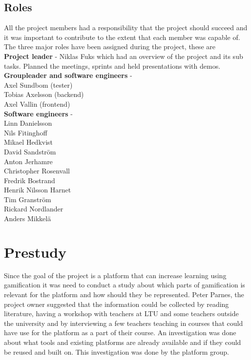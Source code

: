 \documentclass[a4paper,12pt]{article}
\begin{document}
\subsection{Roles} 
All the project members had a responsibility that the project should succeed and it was important to contribute to the extent that each member was capable of.\\
The three major roles have been assigned during the project, these are \\
\textbf{Project leader} - Niklas Fuks which had an overview of the project and its sub tasks. Planned the meetings, sprints and held presentations with demos. \\
\textbf{Groupleader and software engineers} -\\
Axel Sundbom (tester)\\
Tobias Axelsson (backend) \\
Axel Vallin (frontend) \\
\textbf{Software engineers} -\\
Linn Danielsson\\
Nils Fitinghoff\\
Mikael Hedkvist\\
David Sandström\\
Anton Jerhamre\\
Christopher Rosenvall\\
Fredrik Bostrand\\
Henrik Nilsson Harnet\\
Tim Granström\\
Rickard Nordlander\\
Anders Mikkelä\\


\section{Prestudy} 
Since the goal of the project is a platform that can increase learning using gamification it was need to conduct a study about which parts of gamification is relevant for the platform and how should they be represented. Peter Parnes, the project owner suggested that the information could be collected by reading literature, having a workshop with teachers at LTU and some teachers outside the university and by interviewing a few teachers teaching in courses that could have use for the platform as a part of their course. An investigation was done about what tools and existing platforms are already available and if they could be reused and built on. This investigation was done by the platform group.
\end{document}
